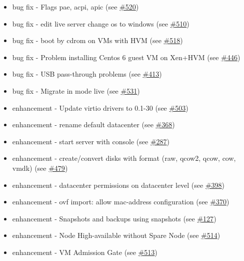 \begin{itemize}
\item bug fix - Flags pae, acpi, apic (see \href{https://srcmaster.eurotux.com/pm/p/etva/ticket/520}{\#520})
\item bug fix - edit live server change os to windows (see \href{https://srcmaster.eurotux.com/pm/p/etva/ticket/510}{\#510})
\item bug fix - boot by cdrom on VMs with HVM (see \href{https://srcmaster.eurotux.com/pm/p/etva/ticket/518}{\#518})
\item bug fix - Problem installing Centos 6 guest VM on Xen+HVM (see \href{https://srcmaster.eurotux.com/pm/p/etva/ticket/446}{\#446})
\item bug fix - USB pass-through problems (see \href{https://srcmaster.eurotux.com/pm/p/etva/ticket/413}{\#413})
\item bug fix - Migrate in mode live (see \href{https://srcmaster.eurotux.com/pm/p/etva/ticket/531}{\#531})
\item enhancement - Update virtio drivers to 0.1-30 (see \href{https://srcmaster.eurotux.com/pm/p/etva/ticket/503}{\#503})
\item enhancement - rename default datacenter (see \href{https://srcmaster.eurotux.com/pm/p/etva/ticket/368}{\#368})
\item enhancement - start server with console (see \href{https://srcmaster.eurotux.com/pm/p/etva/ticket/287}{\#287})
\item enhancement - create/convert disks with format (raw, qcow2, qcow, cow, vmdk) (see \href{https://srcmaster.eurotux.com/pm/p/etva/ticket/479}{\#479})
\item enhancement - datacenter permissions on datacenter level (see \href{https://srcmaster.eurotux.com/pm/p/etva/ticket/398}{\#398})
\item enhancement - ovf import: allow mac-address configuration (see \href{https://srcmaster.eurotux.com/pm/p/etva/ticket/370}{\#370})
\item enhancement - Snapshots and backups using snapshots (see \href{https://srcmaster.eurotux.com/pm/p/etva/ticket/127}{\#127})
\item enhancement - Node High-available without Spare Node (see \href{https://srcmaster.eurotux.com/pm/p/etva/ticket/514}{\#514})
\item enhancement - VM Admission Gate (see \href{https://srcmaster.eurotux.com/pm/p/etva/ticket/513}{\#513})
\end{itemize}

